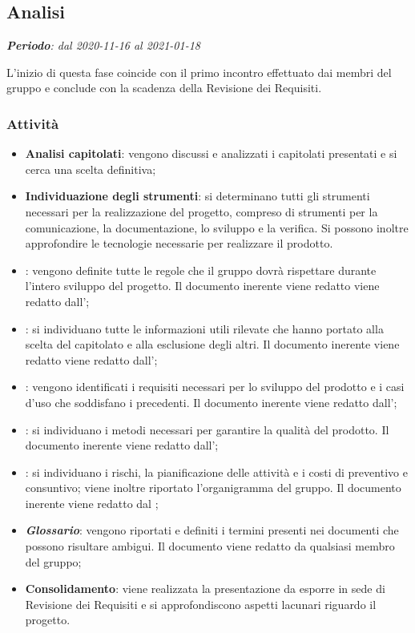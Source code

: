 \subsection{Analisi}

\textit{\textbf{Periodo}: dal 2020-11-16 al 2021-01-18}

L'inizio di questa fase coincide con il primo incontro effettuato dai membri del gruppo e conclude con la scadenza della Revisione dei Requisiti.

\subsubsection{Attività}

\begin{itemize}
\item \textbf{Analisi capitolati}: vengono discussi e analizzati i capitolati presentati e si cerca una scelta definitiva;
\item \textbf{Individuazione degli strumenti}: si determinano tutti gli strumenti necessari per la realizzazione del progetto, compreso di strumenti per la comunicazione, la documentazione, lo sviluppo e la verifica. Si possono inoltre approfondire le tecnologie necessarie per realizzare il prodotto.
\item \textbf{\NdP{}}: vengono definite tutte le regole che il gruppo dovrà rispettare durante l'intero sviluppo del progetto. Il documento inerente viene redatto viene redatto dall'\ammProg{};
\item \textbf{\SdF{}}: si individuano tutte le informazioni utili rilevate che hanno portato alla scelta del capitolato e alla esclusione degli altri. Il documento inerente viene redatto viene redatto dall'\analProg{};
\item \textbf{\AdR{}}: vengono identificati i requisiti necessari per lo sviluppo del prodotto e i casi d'uso che soddisfano i precedenti. Il documento inerente viene redatto dall'\analProg{};
\item \textbf{\PdQ{}}: si individuano i metodi necessari per garantire la qualità del prodotto. Il documento inerente viene redatto dall'\ammProg{};
\item \textbf{\PdP{}}: si individuano i rischi, la pianificazione delle attività e i costi di preventivo e consuntivo; viene inoltre riportato l'organigramma del gruppo. Il documento inerente viene redatto dal \respProg{};
\item \textbf{\textit{Glossario}}: vengono riportati e definiti i termini presenti nei documenti che possono risultare ambigui. Il documento viene redatto da qualsiasi membro del gruppo;
\item \textbf{Consolidamento}: viene realizzata la presentazione da esporre in sede di Revisione dei Requisiti e si approfondiscono aspetti lacunari riguardo il progetto.
\end{itemize}

